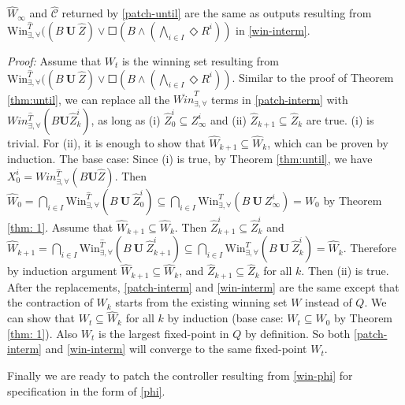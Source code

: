 \begin{theorem}
	$ \widehat{W}_\infty $ and $ \widehat{\mathcal{C}} $ returned by \eqref{patch-until} are the same as outputs resulting from $\text{Win}_{\exists,\forall}^{\widehat{T}}((B\mathbf{\ U\ }\widehat{Z})\vee \Square(B\wedge (\bigwedge_{i\in I} \Diamond R^i)) $ in \eqref{win-interm}. \label{thm:interm}	
\end{theorem}
\emph{Proof:} Assume that $ W_t $ is the winning set resulting from $\text{Win}_{\exists,\forall}^{\widehat{T}}((B\mathbf{\ U\ }\widehat{Z})\vee \Square(B\wedge (\bigwedge_{i\in I} \Diamond R^i)) $. Similar to the proof of Theorem \ref{thm:until}, we can replace all the $ \overline{Win}^{T}_{\exists,\forall} $ terms in \eqref{patch-interm} with $ Win^{\widehat{T}}_{\exists,\forall}(B\mathbf{U}\widehat{Z}_k^i) $, as long as (i) $ \widehat{Z}_0^i\subseteq Z_\infty^i $ and (ii) $ \widehat{Z}_{k+1} \subseteq \widehat{Z}_{k} $ are true. (i) is trivial. For (ii), it is enough to show that $ \widehat{W}_{k+1}\subseteq \widehat{W}_k $, which can be proven by induction. The base case: Since (i) is true, by Theorem \ref{thm:until}, we have $ X_0^i = Win_{\exists,\forall}^{\widehat{T}}(B\mathbf{U}\widehat{Z}) $. Then $ \widehat{W}_0 =\bigcap_{i\in I} \text{Win}_{\exists,\forall}^{\widehat{T}}(B\mathbf{\ U\ }\widehat{Z}_0^i)\subseteq \bigcap_{i\in I} \text{Win}_{\exists,\forall}^{T}(B\mathbf{\ U\ }Z_{\infty}^i) = W_0 $ by Theorem \ref{thm: 1}. Assume that $ \widehat{W}_{k+1} \subseteq \widehat{W}_k $.  Then $ \widehat{Z}_{k+1}^i\subseteq \widehat{Z}_{k}^i  $ and $ \widehat{W}_{k+1} =\bigcap_{i\in I} \text{Win}_{\exists,\forall}^{\widehat{T}}(B\mathbf{\ U\ }\widehat{Z}_{k+1}^i)\subseteq \bigcap_{i\in I} \text{Win}_{\exists,\forall}^{T}(B\mathbf{\ U\ }\widehat{Z}_{k}^i) = \widehat{W}_k $. Therefore by induction argument $ \widehat{W}_{k+1}\subseteq \widehat{W}_k $, and $ \widehat{Z}_{k+1}\subseteq \widehat{Z}_k $ for all $ k $. Then (ii) is true. After the replacements, \eqref{patch-interm} and \eqref{win-interm} are the same except that the contraction of $ W_k $ starts from the existing winning set $ W $ instead of $ Q $. We can show that $ W_t \subseteq \widehat{W}_k $ for all $ k $ by induction (base case: $ W_t \subseteq W_0$ by Theorem \ref{thm: 1}). Also $ W_t $ is the largest fixed-point in $ Q $ by definition. So both \eqref{patch-interm} and \eqref{win-interm} will converge to the same fixed-point $ W_t$.  \QEDB

Finally we are ready to patch the controller resulting from \eqref{win-phi} for specification in the form of \eqref{phi}.

